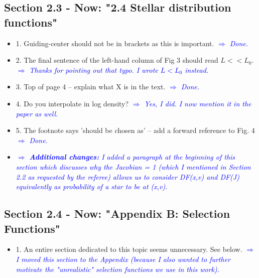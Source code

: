 \documentclass[10pt,a4paper]{article}
\newcommand{\Comment}[1]{\textsl{\textcolor{Blue}{$\Longrightarrow$ {#1}}}}
\begin{document}
\subsection{Section 2.3 - Now: "2.4 Stellar distribution functions"}
\begin{itemize}
\item 1. Guiding-center should not be in brackets as this is important. \Comment{Done.}
\item 2. The final sentence of the left-hand column of Fig 3 should read $L<<L_0$. \Comment{Thanks for pointing out that typo. I wrote $L < L_0$ instead.}
\item 3. Top of page 4 -- explain what X is in the text. \Comment{Done.}
\item 4. Do you interpolate in log density? \Comment{Yes, I did. I now mention it in the paper as well.}
\item 5. The footnote says 'should be chosen as' -- add a forward reference to Fig. 4 \Comment{Done.}
\item \Comment{\textbf{Additional changes:} I added a paragraph at the beginning of this section which discusses why the Jacobian = 1 (which I mentioned in Section 2.2 as requested by the referee) allows us to consider DF(x,v) and DF(J) equivalently as probability of a star to be at (x,v).}
\end{itemize}

\subsection{Section 2.4 - Now: "Appendix B: Selection Functions"}
\begin{itemize}
\item 1. An entire section dedicated to this topic seems unnecessary. See below. \Comment{I moved this section to the Appendix (because I also wanted to further motivate the "unrealistic" selection functions we use in this work).}
\end{itemize}
\end{document}
